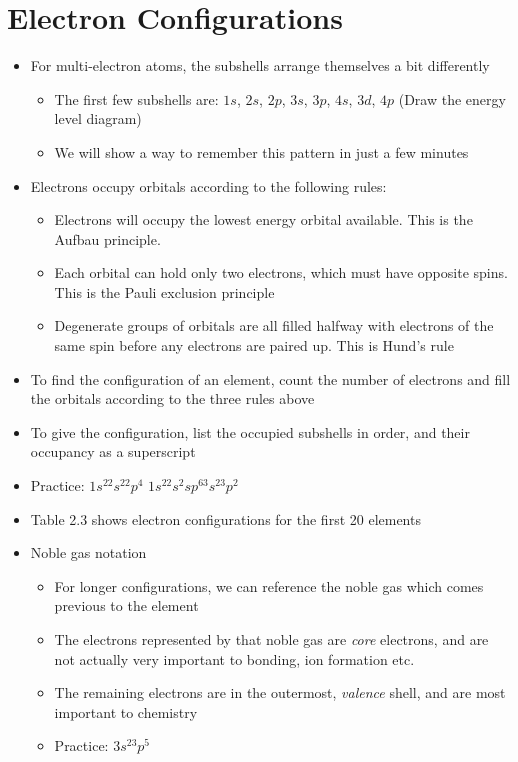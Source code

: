 \documentclass[12pt, openany, letterpaper]{memoir}
\begin{document}
\section{Electron Configurations}
\begin{itemize}
	\item For multi-electron atoms, the subshells arrange themselves a bit differently
	\begin{itemize}
		\item The first few subshells are: $1s$, $2s$, $2p$, $3s$, $3p$, $4s$, $3d$, $4p$ (Draw the energy level diagram)
		\item We will show a way to remember this pattern in just a few minutes
	\end{itemize}
	\item Electrons occupy orbitals according to the following rules:
	\begin{itemize}
		\item Electrons will occupy the lowest energy orbital available. This is the Aufbau principle. 
		\item Each orbital can hold only two electrons, which must have opposite spins. This is the Pauli exclusion principle
		\item Degenerate groups of orbitals are all filled halfway with electrons of the same spin before any electrons are paired up. This is Hund's rule
	\end{itemize}
	\item To find the configuration of an element, count the number of electrons and fill the orbitals according to the three rules above
	\item To give the configuration, list the occupied subshells in order, and their occupancy as a superscript
	\item Practice: $1s^22s^22p^4$ \hspace{2em} $1s^22s^2sp^63s^23p^2$
	\item Table 2.3 shows electron configurations for the first 20 elements
	\item Noble gas notation
	\begin{itemize}
		\item For longer configurations, we can reference the noble gas which comes previous to the element
		\item The electrons represented by that noble gas are \emph{core} electrons, and are not actually very important to bonding, ion formation etc.
		\item The remaining electrons are in the outermost, \emph{valence} shell, and are most important to chemistry
		\item Practice: $3s^23p^5$
	\end{itemize}
\end{itemize}
\end{document}
